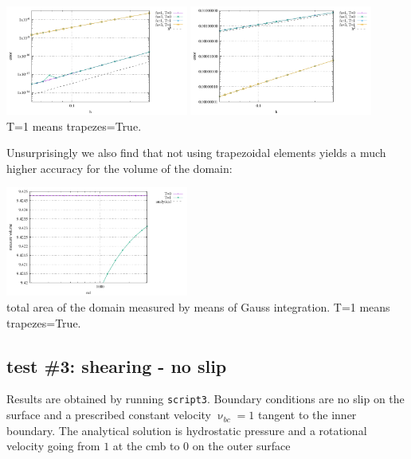\begin{center}
\includegraphics[width=6cm]{python_codes/fieldstone_151/results/test2/errv}
\includegraphics[width=6cm]{python_codes/fieldstone_151/results/test2/errp}\\
{\captionfont T=1 means {\python trapezes=True}.}
\end{center}

Unsurprisingly we also find that not using trapezoidal elements yields a 
much higher accuracy for the volume of the domain:
\begin{center}
\includegraphics[width=6cm]{python_codes/fieldstone_151/results/test2/areas}\\
{\captionfont total area of the domain measured by means of Gauss integration.
T=1 means {\python trapezes=True}.}
\end{center}



\subsection*{test \#3: shearing - no slip}

Results are obtained by running {\tt script3}. Boundary conditions are 
no slip on the surface and a prescribed constant velocity $\upnu_{bc}=1$ tangent 
to the inner boundary.
The analytical solution is hydrostatic pressure and a rotational velocity going from 
$1$ at the cmb to 0 on the outer surface

